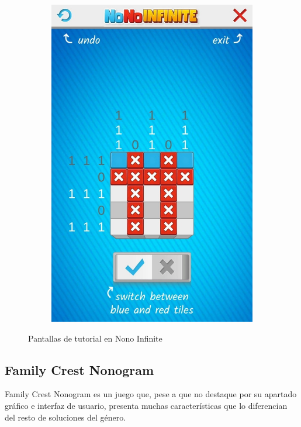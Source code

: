 \begin{figure}[H]
\begin{subfigure}[b]{0.4\linewidth}
     \includegraphics[width=\linewidth]{images/infinite4.jpg}
   \end{subfigure}
   \caption{Pantallas de tutorial en Nono Infinite}
   \label{fig:infinite2}
 \end{figure}

 \subsection{Family Crest Nonogram}

 Family Crest Nonogram es un juego que, pese a que no destaque por su apartado gráfico e interfaz de usuario, presenta muchas características que lo diferencian
 del resto de soluciones del género.

